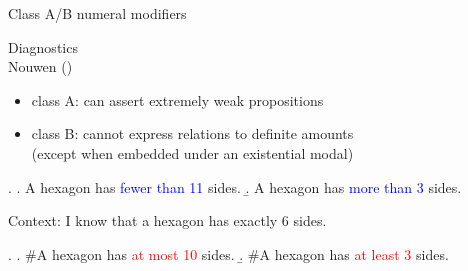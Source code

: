 \documentclass[12pt]{beamer}
\begin{document}
\begin{frame}{Class A/B numeral modifiers}

Diagnostics\\
\scriptsize Nouwen (\citeyear{nouwen2010two})\normalsize

\begin{itemize}
\item class A: can assert extremely weak propositions
\item class B: cannot express relations to definite amounts \\
\footnotesize (except when embedded under an existential modal)\normalsize 
\end{itemize}

\ex. \a. A hexagon has \textcolor{blue}{fewer than 11} sides.
\b. A hexagon has \textcolor{blue}{more than 3} sides.

Context: I know that a hexagon has exactly 6 sides.

\ex. \a. \#A hexagon has \textcolor{red}{at most 10} sides.
\b. \#A hexagon has \textcolor{red}{at least 3} sides.

\end{frame}
\end{document}
